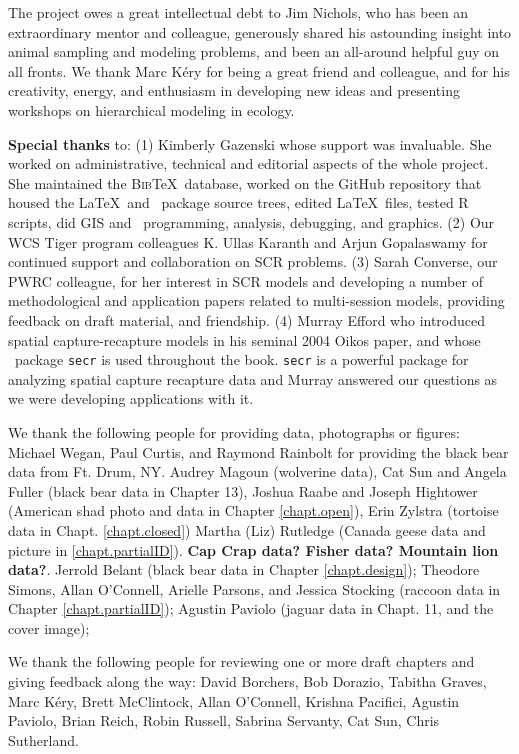 
The project owes a great intellectual debt to Jim Nichols, who has
been an extraordinary mentor and colleague, generously shared his
astounding insight into animal sampling and modeling problems, and
been an all-around helpful guy on all fronts.  We thank Marc K\'{e}ry
for being a great friend and colleague, and for his creativity, %
energy, and enthusiasm in developing new ideas and
presenting workshops on hierarchical modeling in ecology.

{\bf Special thanks} to: (1) Kimberly Gazenski whose support was
invaluable. She worked on administrative, technical and editorial
aspects of the whole project. She maintained the \textsc{Bib}\TeX~database,
worked on the GitHub repository that housed the \LaTeX~and \R~package
source trees, edited \LaTeX~files, tested R scripts, did GIS and
\R~programming, analysis, debugging, and graphics.  (2) Our WCS Tiger
program colleagues K. Ullas Karanth and Arjun Gopalaswamy for
continued support and collaboration on SCR problems.  (3) Sarah
Converse, our PWRC colleague, for her interest in SCR models and
developing a number of methodological and application papers related
to multi-session models, providing feedback on draft material, and
friendship.  (4) Murray Efford who introduced spatial
capture-recapture models %
in his seminal 2004 Oikos paper, and whose \R~package \mbox{\tt secr} is used
throughout the book.  \mbox{\tt secr} is a powerful package for analyzing
spatial capture recapture data and Murray answered our questions as we
were developing applications with it.


We thank the following people for providing data, photographs or figures:
Michael Wegan, Paul Curtis, and Raymond Rainbolt for providing the black bear data from Ft. Drum, NY.
Audrey Magoun (wolverine data), Cat Sun and Angela Fuller (black bear
data in Chapter 13), Joshua Raabe and Joseph Hightower (American shad
photo and data in Chapter \ref{chapt.open}), Erin Zylstra (tortoise
data in Chapt. \ref{chapt.closed}) Martha (Liz) Rutledge (Canada geese
data and picture in \ref{chapt.partialID}).  {\bf Cap Crap data?
  Fisher data?  Mountain lion data?}.  Jerrold Belant (black bear data
in Chapter \ref{chapt.design}); Theodore Simons, Allan O'Connell,
Arielle Parsons, and Jessica Stocking (raccoon data in Chapter
\ref{chapt.partialID}); Agustin Paviolo (jaguar data in Chapt. 11, and
the cover image);

We thank the following people for reviewing one or more draft chapters
and giving feedback along the way:
David Borchers,
Bob Dorazio,
Tabitha Graves,
Marc K\'{e}ry,
Brett McClintock,
Allan O'Connell,
Krishna Pacifici,
Agustin Paviolo,
Brian Reich,
Robin Russell,
Sabrina Servanty,
Cat Sun,
Chris Sutherland.

